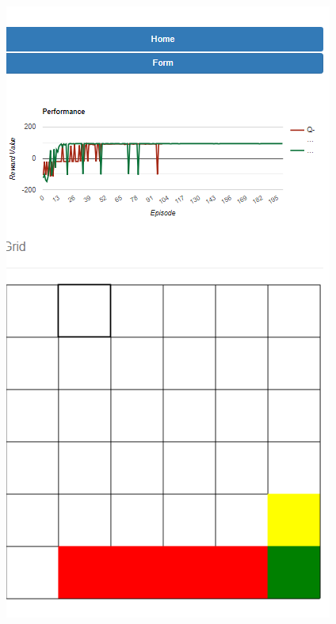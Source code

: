 \begin{figure}[H]
	\centering
	\includegraphics[width=0.7\linewidth]{img/responsive}
	\caption{}
	\label{fig:responsive}
\end{figure}



